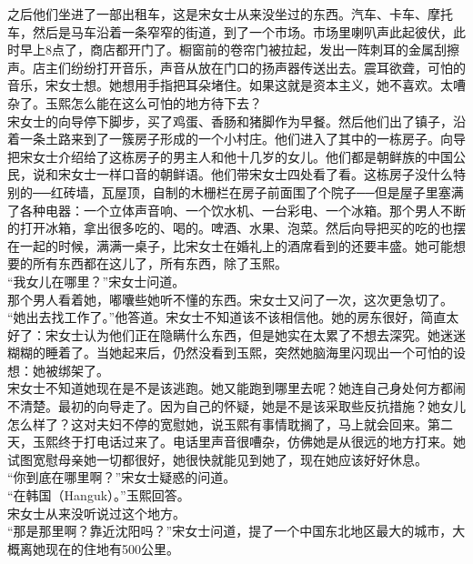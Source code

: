 之后他们坐进了一部出租车，这是宋女士从来没坐过的东西。汽车、卡车、摩托车，然后是马车沿着一条窄窄的街道，到了一个市场。市场里喇叭声此起彼伏，此时早上8点了，商店都开门了。橱窗前的卷帘门被拉起，发出一阵刺耳的金属刮擦声。店主们纷纷打开音乐，声音从放在门口的扬声器传送出去。震耳欲聋，可怕的音乐，宋女士想。她想用手指把耳朵堵住。如果这就是资本主义，她不喜欢。太嘈杂了。玉熙怎么能在这么可怕的地方待下去？\\

宋女士的向导停下脚步，买了鸡蛋、香肠和猪脚作为早餐。然后他们出了镇子，沿着一条土路来到了一簇房子形成的一个小村庄。他们进入了其中的一栋房子。向导把宋女士介绍给了这栋房子的男主人和他十几岁的女儿。他们都是朝鲜族的中国公民，说和宋女士一样口音的朝鲜语。他们带宋女士四处看了看。这栋房子没什么特别的──红砖墙，瓦屋顶，自制的木栅栏在房子前面围了个院子──但是屋子里塞满了各种电器：一个立体声音响、一个饮水机、一台彩电、一个冰箱。那个男人不断的打开冰箱，拿出很多吃的、喝的。啤酒、水果、泡菜。然后向导把买的吃的也摆在一起的时候，满满一桌子，比宋女士在婚礼上的酒席看到的还要丰盛。她可能想要的所有东西都在这儿了，所有东西，除了玉熙。\\

“我女儿在哪里？”宋女士问道。\\

那个男人看着她，嘟囔些她听不懂的东西。宋女士又问了一次，这次更急切了。\\

“她出去找工作了。”他答道。宋女士不知道该不该相信他。她的房东很好，简直太好了：宋女士认为他们正在隐瞒什么东西，但是她实在太累了不想去深究。她迷迷糊糊的睡着了。当她起来后，仍然没看到玉熙，突然她脑海里闪现出一个可怕的设想：她被绑架了。\\

宋女士不知道她现在是不是该逃跑。她又能跑到哪里去呢？她连自己身处何方都闹不清楚。最初的向导走了。因为自己的怀疑，她是不是该采取些反抗措施？她女儿怎么样了？这对夫妇不停的宽慰她，说玉熙有事情耽搁了，马上就会回来。第二天，玉熙终于打电话过来了。电话里声音很嘈杂，仿佛她是从很远的地方打来。她试图宽慰母亲她一切都很好，她很快就能见到她了，现在她应该好好休息。\\

“你到底在哪里啊？”宋女士疑惑的问道。\\

“在韩国（Hanguk）。”玉熙回答。\\

宋女士从来没听说过这个地方。\\

“那是那里啊？靠近沈阳吗？”宋女士问道，提了一个中国东北地区最大的城市，大概离她现在的住地有500公里。\\

